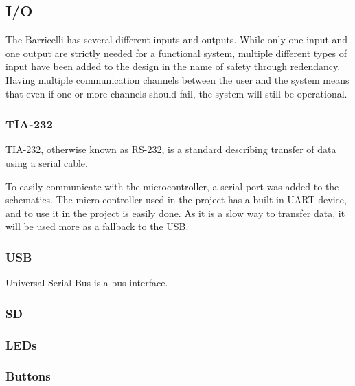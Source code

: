 \subsection{I/O}

The Barricelli has several different inputs and outputs.
While only one input and one output are strictly needed for a functional system, multiple different types of input have been added to the design in the name of safety through redendancy.
Having multiple communication channels between the user and the system means that even if one or more channels should fail, the system will still be operational.

\subsubsection{TIA-232}

TIA-232, otherwise known as RS-232, is a standard describing transfer of data using a serial cable. 

To easily communicate with the microcontroller, a serial port was added to the schematics. The micro controller used in the project has a built in UART device\cite{efm32gg990-datasheet}, 
and to use it in the project is easily done. As it is a slow way to transfer data, it will be used more as a fallback to the USB.

\subsubsection{USB}

Universal Serial Bus is a bus interface.

\subsubsection{SD}


\subsubsection{LEDs}


\subsubsection{Buttons}

